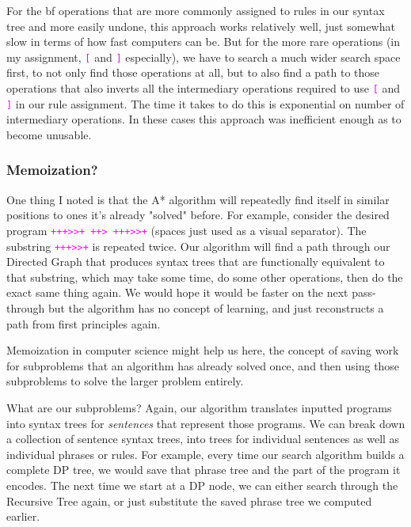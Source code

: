 \documentclass[runningheads]{llncs}
\newcommand{\code}[1]{\texttt{\textcolor{magenta}{\setlength{\fboxsep}{1pt}\colorbox{lightgray!20}{#1}}}}
\begin{document}
For the bf operations that are more commonly assigned to rules in our syntax tree and more easily undone, this approach works relatively well, just somewhat slow in terms of how fast computers can be. But for the more rare operations (in my assignment, \code{[} and \code{]} especially), we have to search a much wider search space first, to not only find those operations at all, but to also find a path to those operations that also inverts all the intermediary operations required to use \code{[} and \code{]} in our rule assignment. The time it takes to do this is exponential on number of intermediary operations. In these cases this approach was inefficient enough as to become unusable.
\subsubsection*{Memoization?}
One thing I noted is that the A* algorithm will repeatedly find itself in similar positions to ones it's already "solved" before. For example, consider the desired program \code{+++>>+ ++> +++>>+} (spaces just used as a visual separator). The substring \code{+++>>+} is repeated twice. Our algorithm will find a path through our Directed Graph that produces syntax trees that are functionally equivalent to that substring, which may take some time, do some other operations, then do the exact same thing again. We would hope it would be faster on the next pass-through but the algorithm has no concept of learning, and just reconstructs a path from first principles again.

Memoization in computer science might help us here, the concept of saving work for subproblems that an algorithm has already solved once, and then using those subproblems to solve the larger problem entirely.

What are our subproblems? Again, our algorithm translates inputted programs into syntax trees for \textit{sentences} that represent those programs. We can break down a collection of sentence syntax trees, into trees for individual sentences as well as individual phrases or rules. For example, every time our search algorithm builds a complete DP tree, we would save that phrase tree and the part of the program it encodes. The next time we start at a DP node, we can either search through the Recursive Tree again, or just substitute the saved phrase tree we computed earlier.
\end{document}
